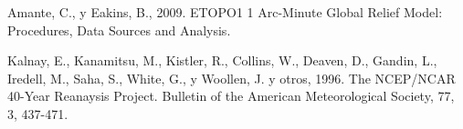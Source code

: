 \documentclass[12pt,spanish,oneside, a4paper]{book}
\begin{document}
\hypertarget{refs}{}
\hypertarget{ref-Amante2009}{}
Amante, C., y Eakins, B., 2009. ETOPO1 1 Arc-Minute Global Relief Model:
Procedures, Data Sources and Analysis.

\hypertarget{ref-Kalnay1996}{}
Kalnay, E., Kanamitsu, M., Kistler, R., Collins, W., Deaven, D., Gandin,
L., Iredell, M., Saha, S., White, G., y Woollen, J. y otros, 1996. The
NCEP/NCAR 40-Year Reanaysis Project. Bulletin of the American
Meteorological Society, 77, 3, 437-471.
\end{document}
